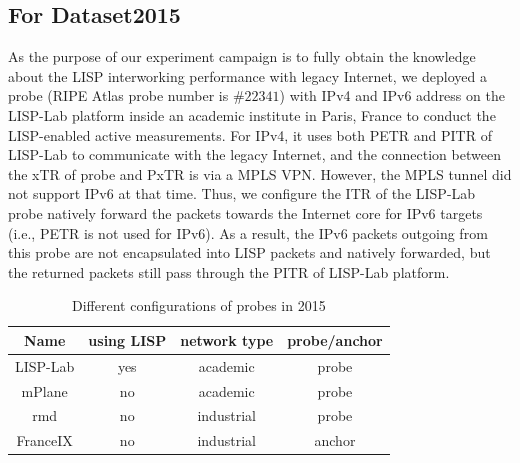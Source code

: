 \subsection{For Dataset2015}
\label{sec:pxtr_meth_2015}
As the purpose of our experiment campaign is to fully obtain the knowledge about the LISP interworking performance with legacy Internet, we deployed a probe (RIPE Atlas probe number is $\#22341$) with IPv4 and IPv6 address on the LISP-Lab platform inside an academic institute in Paris, France to conduct the LISP-enabled active measurements. For IPv4, it uses both PETR and PITR of LISP-Lab to communicate with the legacy Internet, and the connection between the xTR of probe and PxTR is via a MPLS VPN. However, the MPLS tunnel did not support IPv6 at that time. Thus, we configure the ITR of the LISP-Lab probe natively forward the packets towards the Internet core for IPv6 targets (i.e., PETR is not used for IPv6). As a result, the IPv6 packets outgoing from this probe are not encapsulated into LISP packets and natively forwarded, but the returned packets still pass through the PITR of LISP-Lab platform.

\begin{table}[!tb]
	\centering
	\caption{Different configurations of probes in 2015}
	\label{Probes_config_2015}{
		\begin{tabular}{@{}c|c|c|c@{}}
			\hline\hline
			Name & using LISP & network type  & probe/anchor   \\ \hline
			LISP-Lab &  yes & academic & probe\\  \hline    
			mPlane &  no  & academic & probe     	\\  \hline     
			rmd &  no & industrial & probe     	\\  \hline 
			FranceIX &  no & industrial & anchor     	\\  \hline \hline               
		\end{tabular}
	}
\end{table}

